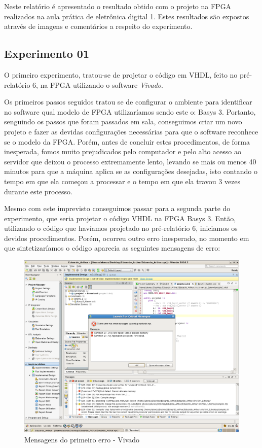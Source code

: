 \documentclass[12pts]{article}
\begin{document}
	Neste relatório é apresentado o resultado obtido com o projeto na FPGA realizados na aula prática de eletrônica digital 1. Estes resultados são expostos através de imagens e comentários a respeito do experimento. 

\subsection{Experimento 01}
\singlespacing
	O primeiro experimento, tratou-se de projetar o código em VHDL, feito no pré-relatório 6, na FPGA utilizando o software \textit{Vivado}. 

	Os primeiros passos seguidos tratou se de configurar o ambiente para identificar no software qual modelo de FPGA utilizaríamos sendo este o: Basys 3. Portanto, senguindo os passos que foram passados em sala, conseguimos criar um novo projeto e fazer as devidas configurações necessárias para que o software reconhece se o modelo da FPGA. Porém, antes de concluir estes procedimentos, de forma inesperada, fomos muito prejudicados pelo computador e pelo alto acesso ao servidor que deixou o processo extremamente lento, levando se mais ou menos 40 minutos para que a máquina aplica se as configurações desejadas, isto contando o tempo em que ela começou a processar e o tempo em que ela travou 3 vezes durante este processo. 
	
	Mesmo com este imprevisto conseguimos passar para a segunda parte do experimento, que seria projetar o código VHDL na FPGA Basys 3. Então, utilizando o código que havíamos projetado no pré-relatório 6, iniciamos os devidos procedimentos. Porém, ocorreu outro erro inesperado, no momento em que sintetizaríamos o código aparecia as seguintes mensagens de erro:

\clearpage
\begin{figure}[!htb]
  \centering
  \includegraphics[scale=0.30]{imagens/tretaMemoria.png}
  \caption{Mensagens do primeiro erro - Vivado}	
  \label{figRotulo}
\end{figure}
\end{document}

